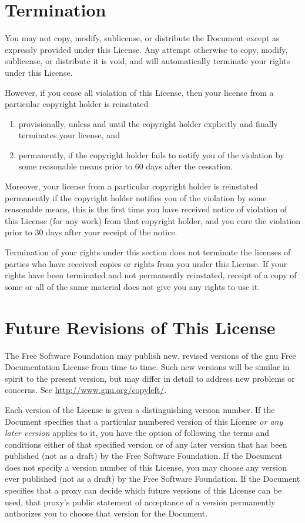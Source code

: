 \section{Termination}

You may not copy, modify, sublicense, or distribute the Document
except as expressly provided under this License.  Any attempt
otherwise to copy, modify, sublicense, or distribute it is void, and
will automatically terminate your rights under this License.

However, if you cease all violation of this License, then your license
from a particular copyright holder is reinstated
\begin{enumerate}
\item provisionally, unless and until the copyright holder explicitly
  and finally terminates your license, and
\item permanently, if the copyright holder fails to notify you of the
  violation by some reasonable means prior to 60 days after the
  cessation.
\end{enumerate}

Moreover, your license from a particular copyright holder is
reinstated permanently if the copyright holder notifies you of the
violation by some reasonable means, this is the first time you have
received notice of violation of this License (for any work) from that
copyright holder, and you cure the violation prior to 30 days after
your receipt of the notice.

Termination of your rights under this section does not terminate the
licenses of parties who have received copies or rights from you under
this License.  If your rights have been terminated and not permanently
reinstated, receipt of a copy of some or all of the same material does
not give you any rights to use it.


\section{Future Revisions of This License}

The Free Software Foundation may publish new, revised versions of the
\gls{gnu} Free Documentation License from time to time.  Such new versions
will be similar in spirit to the present version, but may differ in
detail to address new problems or concerns.  See
\url{http://www.gnu.org/copyleft/}.

Each version of the License is given a distinguishing version number.
If the Document specifies that a particular numbered version of this
License \emph{or any later version} applies to it, you have the option
of following the terms and conditions either of that specified version
or of any later version that has been published (not as a draft) by
the Free Software Foundation.  If the Document does not specify a
version number of this License, you may choose any version ever
published (not as a draft) by the Free Software Foundation.  If the
Document specifies that a proxy can decide which future versions of
this License can be used, that proxy's public statement of acceptance
of a version permanently authorizes you to choose that version for the
Document.


